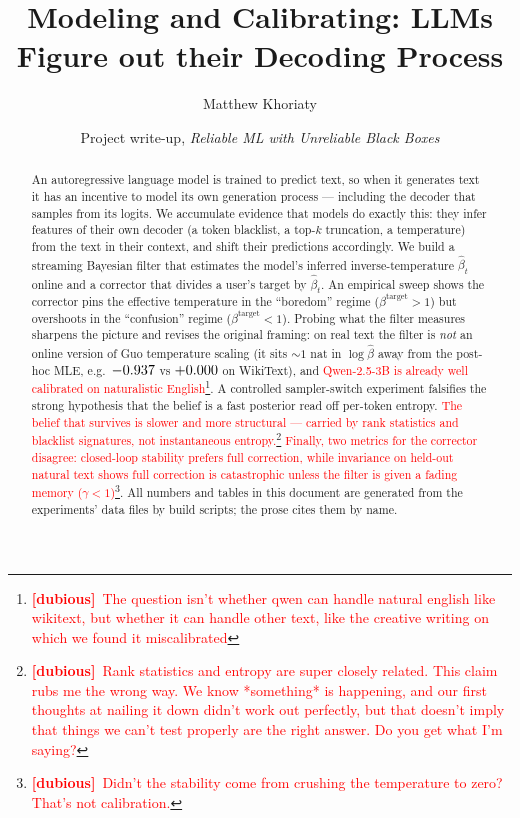 \documentclass[11pt]{article}
\title{Modeling and Calibrating: LLMs Figure out their Decoding Process}
\author{Matthew Khoriaty}
\date{Project write-up, \emph{Reliable ML with Unreliable Black Boxes}}
\newcommand{\dubious}[2][]{\textcolor{red}{#2}\footnote{\textcolor{red}{\textbf{[dubious]}~#1}}}
\begin{document}
\maketitle

\begin{abstract}
An autoregressive language model is trained to predict text, so when it
generates text it has an incentive to model its own generation process ---
including the decoder that samples from its logits. We accumulate evidence that
models do exactly this: they infer features of their own decoder (a token
blacklist, a top-$k$ truncation, a temperature) from the text in their context,
and shift their predictions accordingly. We build a streaming Bayesian filter
that estimates the model's inferred inverse-temperature $\hat\beta_t$ online and
a corrector that divides a user's target by $\hat\beta_t$. An empirical sweep
shows the corrector pins the effective temperature in the ``boredom'' regime
($\beta^{\mathrm{target}}>1$) but overshoots in the ``confusion'' regime
($\beta^{\mathrm{target}}<1$). Probing what the filter measures sharpens the
picture and revises the original framing: on real text the filter is
\emph{not} an online version of Guo temperature scaling (it sits
$\sim\!1$ nat in $\log\hat\beta$ away from the post-hoc MLE, e.g.\
$-0.937$ vs $+0.000$ on WikiText), and \dubious[The question isn't whether qwen can handle natural english like wikitext, but whether it can handle other text, like the creative writing on which we found it miscalibrated]{Qwen-2.5-3B
is already well calibrated on naturalistic English}. A controlled
sampler-switch experiment falsifies the strong hypothesis that the belief is a
fast posterior read off per-token entropy. \dubious[Rank statistics and entropy are super closely related. This claim rubs me the wrong way. We know *something* is happening, and our first thoughts at nailing it down didn't work out perfectly, but that doesn't imply that things we can't test properly are the right answer. Do you get what I'm saying?]{The belief that survives is slower
and more structural --- carried by rank statistics and blacklist signatures,
not instantaneous entropy.} \dubious[Didn't the stability come from crushing the temperature to zero? That's not calibration.]{Finally, two metrics for the corrector disagree:
closed-loop stability prefers full correction, while invariance on held-out
natural text shows full correction is catastrophic unless the filter is given a
fading memory ($\gamma<1$)}. All numbers and tables in this document are
generated from the experiments' data files by build scripts; the prose cites
them by name.
\end{abstract}
\end{document}
